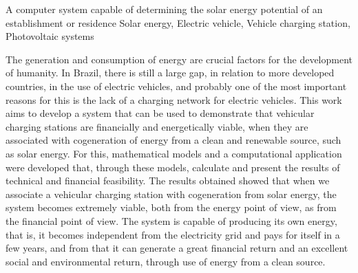 \begin{englishabstract}
{A computer system capable of determining the solar energy potential of an establishment or residence}
{Solar energy, Electric vehicle, Vehicle charging station, Photovoltaic systems}

The generation and consumption of energy are crucial factors for the development of humanity. In Brazil, there is still a large gap, in relation to more developed countries, in the use of electric vehicles, and probably one of the most important reasons for this is the lack of a charging network for electric vehicles. This work aims to develop a system that can be used to demonstrate that vehicular charging stations are financially and energetically viable, when they are associated with cogeneration of energy from a clean and renewable source, such as solar energy. For this, mathematical models and a computational application were developed that, through these models, calculate and present the results of technical and financial feasibility. The results obtained showed that when we associate a vehicular charging station with cogeneration from solar energy, the system becomes extremely viable, both from the energy point of view, as from the financial point of view. The system is capable of producing its own energy, that is, it becomes independent from the electricity grid and pays for itself in a few years, and from that it can generate a great financial return and an excellent social and environmental return, through use of energy from a clean source.

\end{englishabstract}

